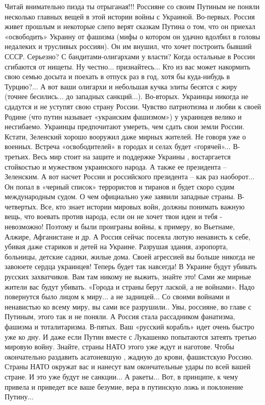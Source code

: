 Читай внимательно пизда ты отрыганая!!!
Россияне со своим Путиным не поняли несколько главных вещей в этой
истории войны с Украиной.
Во-первых. Россия живет прошлым и некоторые слепо верят сказкам Путина о
том, что он приехал «освободить» Украину от фашизма (мифы о котором он
удачно вдолбил в головы недалеких и трусливых россиян). Он им внушил,
что хочет построить бывший СССР. Серьезно? С бандитами-олигархами у
власти? Когда остальные в России сгибаются от нищеты. Ну честно...
признайтесь... Кто из вас может накормить свою семью досыта и поехать в
отпуск раз в год, хотя бы куда-нибудь в Турцию?... А вот ваши олигархи и
небольшая кучка элиты бесятся с жиру (точнее бесились... до западных
санкций...).
Во-вторых. Украинцы никогда не сдадутся и не уступят свою страну России.
Чувство патриотизма и любви к своей Родине (что путин называет
«украиским фашизмом») у украинцев велико и несгибаемо. Украинцы
предпочитают умереть, чем сдать свои земли России. Кстати, Зеленский
хорошо вооружил даже мирных жителей. Не говоря уже о военных. Встреча
«освободителей» в городах и селах будет «горячей»...
В-третьих. Весь мир стоит на защите и поддержке Украины , востаргается
стойкостью и мужеством украинского народа. А также ее президента –
Зеленским. А вот насчет России и российского президента – как раз
наоборот... Он попал в «черный список» террористов и тиранов и будет
скоро судим международным судом. О чем официально уже заявили западные
страны.
В-четвертых. Все, кто знает истории мировых войн, должны понимать
важную вещь, что воевать против народа, если он не хочет твои идеи и
тебя - невозможно! Поэтому и были проиграны войны, к примеру, во
Вьетнаме, Алжире, Афганистане и др. А Россия сейчас посеяла лютую
ненависть к себе, убивая даже стариков и детей на Украине. Разрушая
здания, аэропорта, больницы, детские садики, жилые дома. Своей агрессией
вы больше никогда не завоюете сердца украинцев! Теперь будет так
навсегда! В Украине будут убивать русских захватчиков. Вам там никому не
выжить, знайте это! Сами же мирные жители вас будут убивать. «Города и
страны берут лаской, а не войнами». Надо повернутся было лицом к миру...
а не задницей... Со своими войнами и ненавистью ко всему миру, вы сами
все разрушили.. Увы, россияне, во главе с Путиным, этого так и не
поняли. А Россия стала рассадником фанатизма, фашизма и тоталитаризма.
В-пятых. Ваш «русский корабль» идет очень быстро уже ко дну. И даже
если Путин вместе с Лукашенко попытаются затеять третью мировую войну.
Знайте, страны НАТО этого уже ждут и наготове. Чтобы окончательно
раздавить асатоневшую , жадную до крови, фашистскую Россию. Страны НАТО
окружат вас и нанесут вам окончательные удары по всей вашей стране. И
это уже будут не санкции... А ракеты...
Вот, в принципе, к чему привела и приведет все ваше безумие, вера в
путинскую ложь и поклонение Путину...

